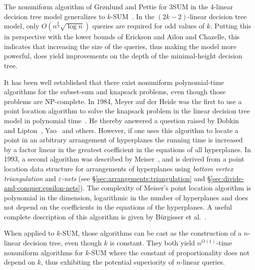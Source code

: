 The nonuniform algorithm of Gr\o nlund and
Pettie for 3SUM in the \(4\)-linear decision tree model
generalizes to \(k\)-SUM~\cite{GP18}.
In the $(2k-2)$-linear decision tree model,
only $O(n^\frac{k}{2}\sqrt{\log n})$ queries are required for odd values of $k$.
Putting this in perspective with the lower bounds of Erickson and Ailon and
Chazelle, this indicates that increasing the size of the queries, thus making
the model more powerful, does yield
improvements on the depth of the minimal-height decision tree.

It has been well established that there exist nonuniform
polynomial-time algorithms for the subset-sum and knapsack problems, even
though those problems are \textsc{NP}-complete.
%
In 1984,
Meyer auf der Heide was the first to use a point location algorithm to solve
the knapsack problem in the linear decision tree model in polynomial time~\cite{M84}.
He
thereby answered a question raised by Dobkin and Lipton~\cite{DL74,DL78},
Yao~\cite{Y82} and others. However, if one uses this algorithm to locate a
point in an arbitrary arrangement of hyperplanes the running time is increased
by a factor linear in the greatest coefficient in the equations of all
hyperplanes.
%
In 1993,
a second algorithm was described by Meiser~\cite{M93}, and is derived from a
point location data structure for arrangements of hyperplanes using
\emph{bottom vertex triangulation} and \emph{\(\varepsilon\)-nets} (see
\S\ref{sec:arrangements:triangulation} and
\S\ref{sec:divide-and-conquer:epsilon-nets}).
%
The complexity of Meiser's point location algorithm is polynomial in the
dimension, logarithmic in the number of hyperplanes and does not depend on the
coefficients in the equations of the hyperplanes. A useful
complete description of this algorithm is given by Bürgisser et
al.~\cite[Section~3.4]{BCS97}.

When applied to \(k\)-SUM, those algorithms can be cast as the construction of
a \(n\)-linear decision tree, even though \(k\) is constant.
They both yield \(n^{O(1)}\)-time nonuniform algorithms for
\(k\)-SUM where the constant of proportionality does not depend on \(k\), thus
exhibiting the potential superiority of $n$-linear queries.
